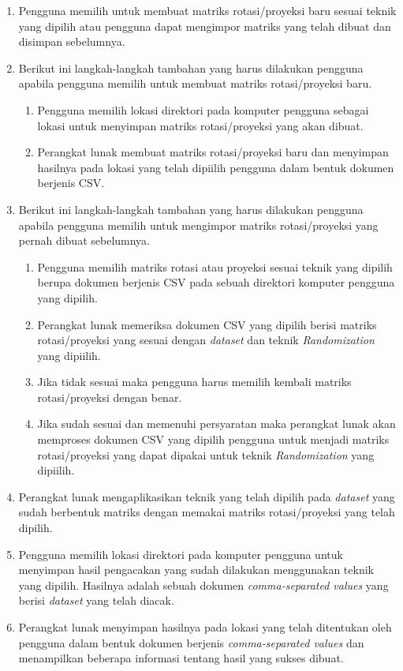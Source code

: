 \begin{enumerate}
    \item Pengguna memilih untuk membuat matriks rotasi/proyeksi baru sesuai teknik yang dipilih atau pengguna dapat mengimpor matriks yang telah dibuat dan disimpan sebelumnya.
    \item Berikut ini langkah-langkah tambahan yang harus dilakukan pengguna apabila pengguna memilih untuk membuat matriks rotasi/proyeksi baru.
    \begin{enumerate}
        \item Pengguna memilih lokasi direktori pada komputer pengguna sebagai lokasi untuk menyimpan matriks rotasi/proyeksi yang akan dibuat.
        \item Perangkat lunak membuat matriks rotasi/proyeksi baru dan menyimpan hasilnya pada lokasi yang telah dipiilih pengguna dalam bentuk dokumen berjenis CSV.
    \end{enumerate}
    \item Berikut ini langkah-langkah tambahan yang harus dilakukan pengguna apabila pengguna memilih untuk mengimpor matriks rotasi/proyeksi yang pernah dibuat sebelumnya.
    \begin{enumerate}
        \item Pengguna memilih matriks rotasi atau proyeksi sesuai teknik yang dipilih berupa dokumen berjenis CSV pada sebuah direktori komputer pengguna yang dipilih.
        \item Perangkat lunak memeriksa dokumen CSV yang dipilih berisi matriks rotasi/proyeksi yang sesuai dengan \textit{dataset} dan teknik \textit{Randomization} yang dipiilih.
        \item Jika tidak sesuai maka pengguna harus memilih kembali matriks rotasi/proyeksi dengan benar.
        \item Jika sudah sesuai dan memenuhi persyaratan maka perangkat lunak akan memproses dokumen CSV yang dipilih pengguna untuk menjadi matriks rotasi/proyeksi yang dapat dipakai untuk teknik \textit{Randomization} yang dipiilih.
    \end{enumerate}
    \item Perangkat lunak mengaplikasikan teknik yang telah dipilih pada \textit{dataset} yang sudah berbentuk matriks dengan memakai matriks rotasi/proyeksi yang telah dipilih.
    \item Pengguna memilih lokasi direktori pada komputer pengguna untuk menyimpan hasil pengacakan yang sudah dilakukan menggunakan teknik yang dipilih. Hasilnya adalah sebuah dokumen \textit{comma-separated values} yang berisi \textit{dataset} yang telah diacak.
    \item Perangkat lunak menyimpan hasilnya pada lokasi yang telah ditentukan oleh pengguna dalam bentuk dokumen berjenis \textit{comma-separated values} dan menampilkan beberapa informasi tentang hasil yang sukses dibuat.
\end{enumerate}

